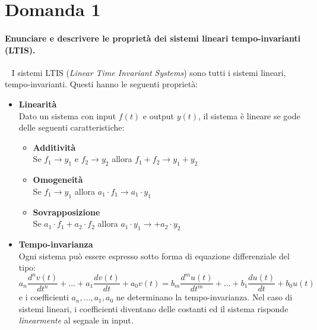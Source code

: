 \documentclass[a4paper,oneside]{scrbook}
\begin{document}
\section*{Domanda 1}
\paragraph{Enunciare e descrivere le proprietà dei sistemi lineari tempo-invarianti (LTIS).}\
\newline
I sistemi LTIS (\textit{Linear Time Invariant Systems}) sono tutti i sistemi lineari, tempo-invarianti. Questi hanno le seguenti proprietà:
\begin{itemize}
	\item \textbf{Linearità}\\
	Dato un sistema con input $f(t)$ e output $y(t)$, il sistema è lineare se gode delle seguenti caratteristiche:
	\begin{itemize}
		\item \textbf{Additività}\\
		Se $f_1 \rightarrow y_1$ e $f_2 \rightarrow y_2$ allora $f_1+f_2 \rightarrow y_1+y_2$
		\item \textbf{Omogeneità}\\
		Se $f_1 \rightarrow y_1$ allora $a_1\cdot f_1 \rightarrow a_1 \cdot y_1$
		\item \textbf{Sovrapposizione}\\
		Se $a_1 \cdot f_1 + a_2 \cdot f_2$ allora $a_1 \cdot y_1 \rightarrow + a_2 \cdot y_2$
	\end{itemize}
	\item \textbf{Tempo-invarianza}\\
	Ogni sistema può essere espresso sotto forma di equazione differenziale del tipo:
	\begin{equation*}
		a_n\frac{d^nv(t)}{dt^n} + \ldots + a_1\frac{dv(t)}{dt} + a_0v(t) = b_m\frac{d^mu(t)}{dt^m} + \ldots + b_1\frac{du(t)}{dt} + b_0u(t)
	\end{equation*}
	e i coefficienti $a_n, \ldots, a_1, a_0$ ne determinano la tempo-invarianza.
	Nel caso di sistemi lineari, i coefficienti diventano delle costanti ed il sistema risponde \textit{linearmente} al segnale in input.
\end{itemize}
\end{document}
